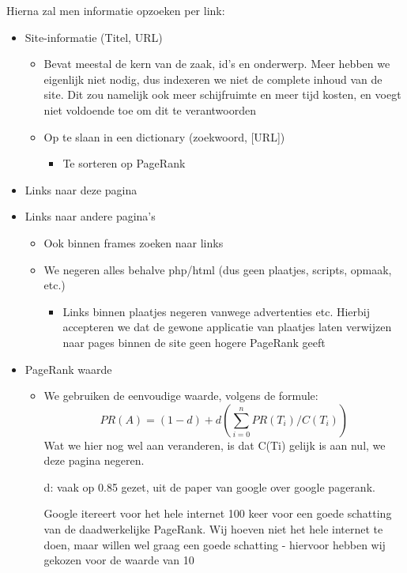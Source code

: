 \documentclass[12pt,a4paper]{article}
\begin{document}
Hierna zal men informatie opzoeken per link:
\begin{itemize}
\item Site-informatie (Titel, URL)
\begin{itemize}
\item Bevat meestal de kern van de zaak, id's en onderwerp. Meer hebben we eigenlijk niet nodig, dus indexeren we niet de complete inhoud van de site. Dit zou namelijk ook meer schijfruimte en meer tijd kosten, en voegt niet voldoende toe om dit te verantwoorden
\item Op te slaan in een dictionary (zoekwoord, [URL])
\begin{itemize}
\item Te sorteren op PageRank
\end{itemize}
\end{itemize}
\item Links naar deze pagina
\item Links naar andere pagina's
\begin{itemize}
\item Ook binnen frames zoeken naar links
\item We negeren alles behalve php/html (dus geen plaatjes, scripts, opmaak, etc.)
\begin{itemize}
\item Links binnen plaatjes negeren vanwege advertenties etc. Hierbij accepteren we dat de gewone applicatie van plaatjes laten verwijzen naar pages binnen de site geen hogere PageRank geeft
\end{itemize} 
\end{itemize}
\clearpage
\item PageRank waarde
\begin{itemize}
\item We gebruiken de eenvoudige waarde, volgens de formule:
\[PR(A) = (1 - d) + d(\sum_{i=0}^{n}PR(T_{i})/C(T_{i}))\]
Wat we hier nog wel aan veranderen, is dat C(Ti) gelijk is aan nul, we deze pagina negeren.

d: vaak op 0.85 gezet, uit de paper van google over google pagerank. \cite{6}

Google itereert voor het hele internet 100 keer voor een goede schatting van de daadwerkelijke PageRank. Wij hoeven niet het hele internet te doen, maar willen wel graag een goede schatting - hiervoor hebben wij gekozen voor de waarde van 10
\end{itemize}
\end{itemize}
\end{document}
